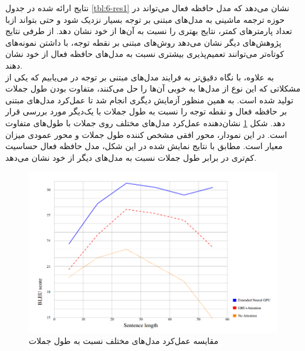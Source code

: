 نتایج ارائه شده در جدول \ref{tbl:6-res1} نشان می‌دهد که مدل حافظه فعال می‌تواند در حوزه ترجمه ماشینی به مدل‌های مبتنی بر توجه بسیار نزدیک شود و حتی بتواند ازبا تعداد پارمترهای کمتر، نتایج بهتری را نسبت به آن‌ها از خود نشان دهد. از طرفی نتایج پژوهش‌های دیگر نشان می‌دهد روش‌های مبتنی بر نقطه توجه، با داشتن نمونه‌های کوتاه‌تر می‌توانند تعمیم‌پذیری بیشتری نسبت به مدل‌های حافظه فعال از خود نشان دهند. 
\\
به علاوه، با نگاه دقیق‌تر به فرایند مدل‌های مبتنی بر توجه در می‌یابیم که یکی از مشکلاتی که این نوع از مدل‌ها به خوبی آن‌ها را حل می‌کنند، متفاوت بودن طول جملات تولید شده است. به همین منظور آزمایش دیگری انجام شد تا عمل‌کرد مدل‌های مبتنی بر حافظه فعال و نقطه توجه را نسبت به طول جملات با یک‌دیگر مورد بررسی قرار دهد. شکل \ref{fig:6-res2} نشان‌دهنده عمل‌کرد مدل‌های مختلف روی جملات با طول‌های متفاوت است. در این نمودار، محور افقی مشخص کننده طول جملات و محور عمودی میزان معیار  است. مطابق با نتایج نمایش شده در این شکل، مدل حافظه فعال حساسیت کم‌تری در برابر طول جملات نسبت به مدل‌های دیگر از خود نشان می‌دهد. 


\begin{figure}[h]
\centering
\includegraphics[scale=0.5]{Imgs/activeMemoryRes2.png}
\caption{مقایسه عمل‌کرد مدل‌های مختلف نسبت به طول جملات \cite{lukas2017can}}
\label{fig:6-res2}
\end{figure}

